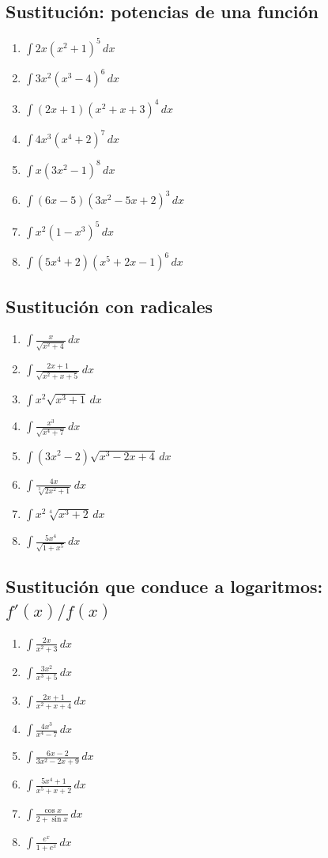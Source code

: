 \documentclass[12pt]{article}
\theoremstyle{definition}
\theoremstyle{remark}
\begin{document}
\subsection{Sustitución: potencias de una función}
\begin{enumerate}[label=\arabic*.,start=65]
\item $\displaystyle \int 2x(x^2+1)^5\,dx$
\item $\displaystyle \int 3x^2(x^3-4)^6\,dx$
\item $\displaystyle \int(2x+1)(x^2+x+3)^4\,dx$
\item $\displaystyle \int 4x^3(x^4+2)^7\,dx$
\item $\displaystyle \int x(3x^2-1)^8\,dx$
\item $\displaystyle \int(6x-5)(3x^2-5x+2)^3\,dx$
\item $\displaystyle \int x^2(1-x^3)^5\,dx$
\item $\displaystyle \int(5x^4+2)(x^5+2x-1)^6\,dx$
\end{enumerate}

\subsection{Sustitución con radicales}
\begin{enumerate}[label=\arabic*.,start=73]
\item $\displaystyle \int\frac{x}{\sqrt{x^2+4}}\,dx$
\item $\displaystyle \int\frac{2x+1}{\sqrt{x^2+x+5}}\,dx$
\item $\displaystyle \int x^2\sqrt{x^3+1}\,dx$
\item $\displaystyle \int\frac{x^3}{\sqrt{x^4+7}}\,dx$
\item $\displaystyle \int(3x^2-2)\sqrt{x^3-2x+4}\,dx$
\item $\displaystyle \int\frac{4x}{\sqrt[3]{2x^2+1}}\,dx$
\item $\displaystyle \int x^2\sqrt[4]{x^3+2}\,dx$
\item $\displaystyle \int\frac{5x^4}{\sqrt{1+x^5}}\,dx$
\end{enumerate}

\subsection{Sustitución que conduce a logaritmos: $f'(x)/f(x)$}
\begin{enumerate}[label=\arabic*.,start=81]
\item $\displaystyle \int\frac{2x}{x^2+3}\,dx$
\item $\displaystyle \int\frac{3x^2}{x^3+5}\,dx$
\item $\displaystyle \int\frac{2x+1}{x^2+x+4}\,dx$
\item $\displaystyle \int\frac{4x^3}{x^4-7}\,dx$
\item $\displaystyle \int\frac{6x-2}{3x^2-2x+9}\,dx$
\item $\displaystyle \int\frac{5x^4+1}{x^5+x+2}\,dx$
\item $\displaystyle \int\frac{\cos x}{2+\sin x}\,dx$
\item $\displaystyle \int\frac{e^x}{1+e^x}\,dx$
\end{enumerate}
\end{document}
